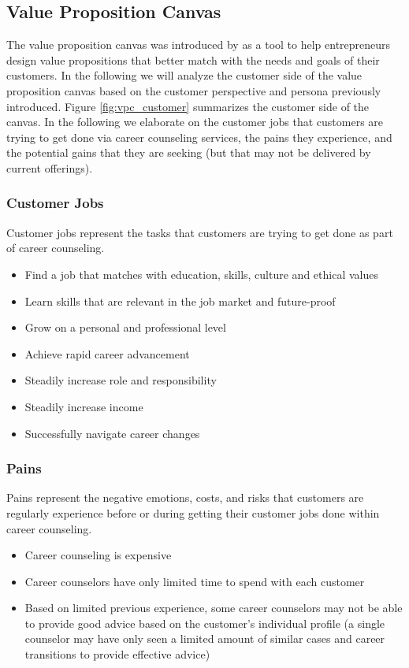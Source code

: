\subsection{Value Proposition Canvas}

The value proposition canvas was introduced by \cite{osterwalderValuePropositionDesign2014} as a
tool to help entrepreneurs design value propositions that better match with the needs and goals of their customers.
In the following we will analyze the customer side of the value proposition canvas based on the customer perspective
and persona previously introduced. Figure \ref{fig:vpc_customer} summarizes the customer side of the canvas. In the
following we elaborate on the customer jobs that customers are trying to get done via career counseling services, the
pains they experience, and the potential gains that they are seeking (but that may not be delivered by current offerings).

\subsubsection{Customer Jobs}

Customer jobs represent the tasks that customers are trying to get done as part of career counseling.

\begin{itemize}
    \item Find a job that matches with education, skills, culture and ethical values
    \item Learn skills that are relevant in the job market and future-proof
    \item Grow on a personal and professional level
    \item Achieve rapid career advancement
    \item Steadily increase role and responsibility
    \item Steadily increase income
    \item Successfully navigate career changes
\end{itemize}

\subsubsection{Pains}

Pains represent the negative emotions, costs, and risks that customers are regularly experience before
or during getting their customer jobs done within career counseling.

\begin{itemize}
    \item Career counseling is expensive
    \item Career counselors have only limited time to spend with each customer
    \item Based on limited previous experience, some career counselors may not be able to provide
        good advice based on the customer's individual profile (a single counselor may have only
        seen a limited amount of similar cases and career transitions to provide effective advice)
\end{itemize}

